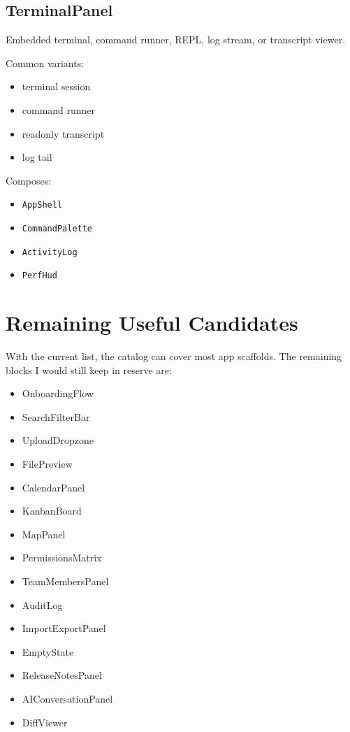 \subsection{TerminalPanel}\label{record-128-terminalpanel}

Embedded terminal, command runner, REPL, log stream, or transcript viewer.

Common variants:

\begin{itemize}
\tightlist
\item
  terminal session
\item
  command runner
\item
  readonly transcript
\item
  log tail
\end{itemize}

Composes:

\begin{itemize}
\tightlist
\item
  \texttt{A\allowbreak{}p\allowbreak{}p\allowbreak{}S\allowbreak{}h\allowbreak{}e\allowbreak{}l\allowbreak{}l}
\item
  \texttt{C\allowbreak{}o\allowbreak{}m\allowbreak{}m\allowbreak{}a\allowbreak{}n\allowbreak{}d\allowbreak{}P\allowbreak{}a\allowbreak{}l\allowbreak{}e\allowbreak{}t\allowbreak{}t\allowbreak{}e}
\item
  \texttt{A\allowbreak{}c\allowbreak{}t\allowbreak{}i\allowbreak{}v\allowbreak{}i\allowbreak{}t\allowbreak{}y\allowbreak{}L\allowbreak{}o\allowbreak{}g}
\item
  \texttt{P\allowbreak{}e\allowbreak{}r\allowbreak{}f\allowbreak{}H\allowbreak{}u\allowbreak{}d}
\end{itemize}

\section{Remaining Useful Candidates}\label{record-128-remaining-useful-candidates}

With the current list, the catalog can cover most app scaffolds. The remaining blocks I would still keep in reserve are:

\begin{itemize}
\tightlist
\item
  OnboardingFlow
\item
  SearchFilterBar
\item
  UploadDropzone
\item
  FilePreview
\item
  CalendarPanel
\item
  KanbanBoard
\item
  MapPanel
\item
  PermissionsMatrix
\item
  TeamMembersPanel
\item
  AuditLog
\item
  ImportExportPanel
\item
  EmptyState
\item
  ReleaseNotesPanel
\item
  AIConversationPanel
\item
  DiffViewer
\end{itemize}

